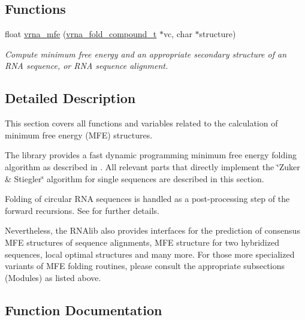 \subsection*{Functions}
\begin{DoxyCompactItemize}
\item 
float \hyperlink{group__mfe__fold_gabd3b147371ccf25c577f88bbbaf159fd}{vrna\+\_\+mfe} (\hyperlink{group__fold__compound_ga1b0cef17fd40466cef5968eaeeff6166}{vrna\+\_\+fold\+\_\+compound\+\_\+t} $\ast$vc, char $\ast$structure)
\begin{DoxyCompactList}\small\item\em Compute minimum free energy and an appropriate secondary structure of an R\+NA sequence, or R\+NA sequence alignment. \end{DoxyCompactList}\end{DoxyCompactItemize}


\subsection{Detailed Description}
This section covers all functions and variables related to the calculation of minimum free energy (M\+FE) structures. 

The library provides a fast dynamic programming minimum free energy folding algorithm as described in \cite{zuker:1981}. All relevant parts that directly implement the \char`\"{}\+Zuker \& Stiegler\char`\"{} algorithm for single sequences are described in this section.

Folding of circular R\+NA sequences is handled as a post-\/processing step of the forward recursions. See \cite{hofacker:2006} for further details.

Nevertheless, the R\+N\+Alib also provides interfaces for the prediction of consensus M\+FE structures of sequence alignments, M\+FE structure for two hybridized sequences, local optimal structures and many more. For those more specialized variants of M\+FE folding routines, please consult the appropriate subsections (Modules) as listed above. 

\subsection{Function Documentation}
